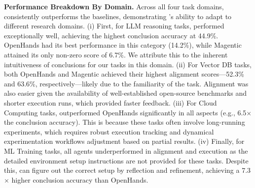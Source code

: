 \noindent\textbf{Performance Breakdown By Domain.}
Across all four task domains, \sys consistently outperforms the baselines, demonstrating \sys's ability to adapt to different research domains. 
(i) First, for LLM reasoning tasks, \sys performed exceptionally well, achieving the highest conclusion accuracy at 44.9\%. OpenHands had its best performance in this category (14.2\%), while Magentic attained its only non-zero score of 6.7\%. We attribute this to the inherent intuitiveness of conclusions for our tasks in this domain. 
(ii) For Vector DB tasks, both OpenHands and Magentic achieved their highest alignment scores—52.3\% and 63.6\%, respectively—likely due to the familiarity of the task. Alignment was also easier given the availability of well-established open-source benchmarks and shorter execution runs, which provided faster feedback. 
(iii) For Cloud Computing tasks, \sys outperformed OpenHands significantly in all aspects (e.g., 6.5$\times$ the conclusion accuracy).
This is because these tasks often involve long-running experiments, which requires robust execution tracking and dynamical experimentation workflows adjustment based on partial results. 
(iv) Finally, for ML Training tasks, all agents underperformed in alignment and execution as the detailed environment setup instructions are not provided for these tasks.
Despite this, \sys can figure out the correct setup by reflection and refinement, achieving a 7.3$\times$ higher conclusion accuracy than OpenHands.

